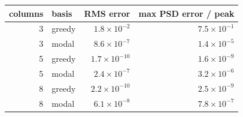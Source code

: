 \begin{tabular}{rlrr}
\toprule
columns & basis & RMS error & max PSD error / peak \\
\midrule
3 & greedy & $1.8\times10^{-2}$ & $7.5\times10^{-1}$ \\
3 & modal & $8.6\times10^{-7}$ & $1.4\times10^{-5}$ \\
5 & greedy & $1.7\times10^{-10}$ & $1.6\times10^{-9}$ \\
5 & modal & $2.4\times10^{-7}$ & $3.2\times10^{-6}$ \\
8 & greedy & $2.2\times10^{-10}$ & $2.5\times10^{-9}$ \\
8 & modal & $6.1\times10^{-8}$ & $7.8\times10^{-7}$ \\
\bottomrule
\end{tabular}
